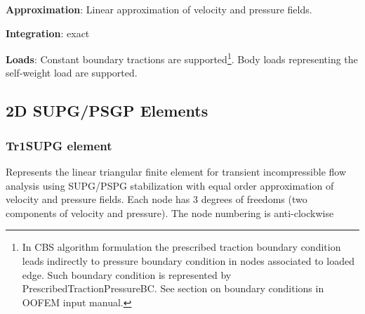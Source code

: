 \documentclass[a4paper]{article}
\newcommand{\descitem}[1]{{\noindent \bf #1}:}
\begin{document}
\descitem{Approximation} Linear approximation of velocity and pressure
fields.

\descitem{Integration}
exact

\descitem{Loads} Constant boundary tractions are supported\footnote{In CBS algorithm formulation the prescribed traction
boundary condition leads indirectly to pressure boundary condition in
nodes associated to loaded edge. Such boundary condition is
represented by PrescribedTractionPressureBC. See section on boundary
conditions in OOFEM input manual.}. Body loads
representing the self-weight load are supported.

\subsection{2D SUPG/PSGP Elements}
\subsubsection{Tr1SUPG element}
\label{Tr1SUPG}
Represents the linear triangular finite element for transient
incompressible flow analysis using SUPG/PSPG stabilization with equal order
approximation of velocity and pressure fields. Each node has 3 degrees
of freedoms (two components of velocity and pressure).
The node numbering is anti-clockwise
\end{document}
